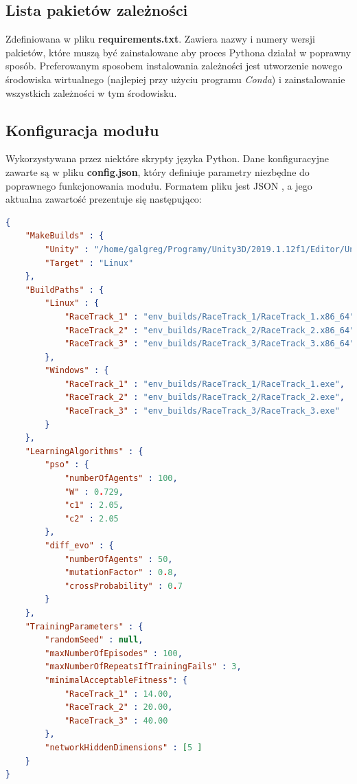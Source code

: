\subsection{Lista pakietów zależności}
Zdefiniowana w pliku \textbf{requirements.txt}. Zawiera nazwy i numery wersji pakietów, które muszą być zainstalowane aby proces Pythona działał w poprawny sposób. Preferowanym sposobem instalowania zależności jest utworzenie nowego środowiska wirtualnego (najlepiej przy użyciu programu \textit{Conda}) i zainstalowanie wszystkich zależności w tym środowisku.

\subsection{Konfiguracja modułu}
\label{ConfigOverview}
Wykorzystywana przez niektóre skrypty języka Python. Dane konfiguracyjne zawarte są w pliku \textbf{config.json}, który definiuje parametry niezbędne do poprawnego funkcjonowania modułu. Formatem pliku jest JSON \cite{json:standard}, a jego aktualna zawartość prezentuje się następująco:

\vspace{0.5cm}
\begin{lstlisting}[language=json]
{
    "MakeBuilds" : {
        "Unity" : "/home/galgreg/Programy/Unity3D/2019.1.12f1/Editor/Unity",
        "Target" : "Linux"
    },
    "BuildPaths" : {
        "Linux" : {
            "RaceTrack_1" : "env_builds/RaceTrack_1/RaceTrack_1.x86_64",
            "RaceTrack_2" : "env_builds/RaceTrack_2/RaceTrack_2.x86_64",
            "RaceTrack_3" : "env_builds/RaceTrack_3/RaceTrack_3.x86_64"
        },
        "Windows" : {
            "RaceTrack_1" : "env_builds/RaceTrack_1/RaceTrack_1.exe",
            "RaceTrack_2" : "env_builds/RaceTrack_2/RaceTrack_2.exe",
            "RaceTrack_3" : "env_builds/RaceTrack_3/RaceTrack_3.exe"
        }
    },
    "LearningAlgorithms" : {
        "pso" : {
            "numberOfAgents" : 100,
            "W" : 0.729,
            "c1" : 2.05,
            "c2" : 2.05
        },
        "diff_evo" : {
            "numberOfAgents" : 50,
            "mutationFactor" : 0.8,
            "crossProbability" : 0.7
        }
    },
    "TrainingParameters" : {
        "randomSeed" : null,
        "maxNumberOfEpisodes" : 100,
        "maxNumberOfRepeatsIfTrainingFails" : 3,
        "minimalAcceptableFitness": {
            "RaceTrack_1" : 14.00,
            "RaceTrack_2" : 20.00,
            "RaceTrack_3" : 40.00
        },
        "networkHiddenDimensions" : [5 ]
    }
}
\end{lstlisting}

